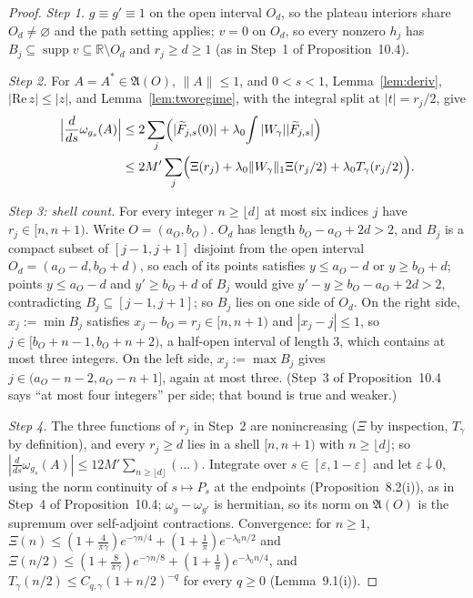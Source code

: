 \documentclass[11pt,a4paper]{article}
\newcommand{\R}{\mathbb{R}}
\newcommand{\A}{\mathfrak{A}}
\DeclareMathOperator{\supp}{supp}
\newcommand{\Ft}{\widetilde F}
\theoremstyle{plain}
\theoremstyle{definition}
\begin{document}
\begin{proof}
\emph{Step 1.}  $g\equiv g'\equiv1$ on the open interval $O_d$, so the plateau interiors share
$O_d\ne\varnothing$ and the path setting applies; $v=0$ on $O_d$, so every nonzero $h_j$ has
$B_j\subseteq\supp v\subseteq\R\setminus O_d$ and $r_j\ge d\ge1$ (as in Step~1 of
Proposition~10.4).

\emph{Step 2.}  For $A=A^*\in\A(O)$, $\|A\|\le1$, and $0<s<1$, Lemma~\ref{lem:deriv},
$|\mathrm{Re}\,z|\le|z|$, and Lemma~\ref{lem:tworegime}, with the integral split at
$|t|=r_j/2$, give
\begin{align*}
 \Bigl|\frac d{ds}\omega_{g_s}(A)\Bigr|
 &\le2\sum_j\Bigl(|\Ft_{j,s}(0)|+\lambda_0\!\int|W_\gamma||\Ft_{j,s}|\Bigr)\\
 &\le2M'\sum_j\Bigl(\Xi(r_j)+\lambda_0\|W_\gamma\|_1\Xi(r_j/2)+\lambda_0T_\gamma(r_j/2)\Bigr).
\end{align*}

\emph{Step 3: shell count.}  For every integer $n\ge\lfloor d\rfloor$ at most six indices $j$
have $r_j\in[n,n+1)$.  Write $O=(a_O,b_O)$.  $O_d$ has length $b_O-a_O+2d>2$, and $B_j$ is a
compact subset of $[j-1,j+1]$ disjoint from the open interval $O_d=(a_O-d,b_O+d)$, so each of
its points satisfies $y\le a_O-d$ or $y\ge b_O+d$; points $y\le a_O-d$ and $y'\ge b_O+d$ of $B_j$
would give $y'-y\ge b_O-a_O+2d>2$, contradicting $B_j\subseteq[j-1,j+1]$; so $B_j$ lies on one
side of $O_d$.  On the right side,
$x_j:=\min B_j$ satisfies $x_j-b_O=r_j\in[n,n+1)$ and $|x_j-j|\le1$, so
$j\in[b_O+n-1,b_O+n+2)$, a half-open interval of length $3$, which contains at most three
integers.  On the left side, $x_j:=\max B_j$ gives $j\in(a_O-n-2,a_O-n+1]$, again at most
three.  (Step~3 of Proposition~10.4 says ``at most four integers'' per side; that bound is
true and weaker.)

\emph{Step 4.}  The three functions of $r_j$ in Step~2 are nonincreasing ($\Xi$ by inspection,
$T_\gamma$ by definition), and every $r_j\ge d$ lies in a shell $[n,n+1)$ with
$n\ge\lfloor d\rfloor$; so $|\frac d{ds}\omega_{g_s}(A)|\le12M'\sum_{n\ge\lfloor d\rfloor}(\dots)$.
Integrate over $s\in[\varepsilon,1-\varepsilon]$ and let $\varepsilon\downarrow0$, using the
norm continuity of $s\mapsto P_s$ at the endpoints (Proposition~8.2(i)), as in Step~4 of
Proposition~10.4; $\omega_g-\omega_{g'}$ is hermitian, so its norm on $\A(O)$ is the supremum
over self-adjoint contractions.  Convergence: for $n\ge1$,
$\Xi(n)\le(1+\frac4{\pi\gamma})e^{-\gamma n/4}+(1+\frac1\pi)e^{-\lambda_0n/2}$ and
$\Xi(n/2)\le(1+\frac8{\pi\gamma})e^{-\gamma n/8}+(1+\frac1\pi)e^{-\lambda_0n/4}$, and
$T_\gamma(n/2)\le C_{q,\gamma}(1+n/2)^{-q}$ for every $q\ge0$ (Lemma~9.1(i)).
\end{proof}
\end{document}

